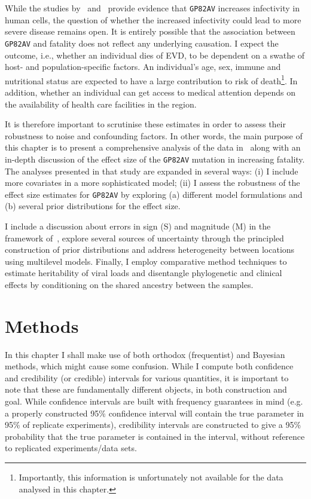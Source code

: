 While the studies by~\cite{Urbanowicz2016} and~\cite{Diehl2016} provide evidence that \verb|GP82AV| increases infectivity in human cells, the question of whether the increased infectivity could lead to more severe disease remains open.
It is entirely possible that the association between \verb|GP82AV| and fatality does not reflect any underlying causation.
I expect the outcome, i.e., whether an individual dies of EVD, to be dependent on a swathe of host- and population-specific factors.
An individual's age, sex, immune and nutritional status are expected to have a large contribution to risk of death\footnote{Importantly, this information is unfortunately not available for the data analysed in this chapter.}.
In addition, whether an individual can get access to medical attention depends on the availability of health care facilities in the region.

It is therefore important to scrutinise these estimates in order to assess their robustness to noise and confounding factors.
In other words, the main purpose of this chapter is to present a comprehensive analysis of the data in~\cite{Diehl2016} along with an in-depth discussion of the effect size of  the \verb|GP82AV| mutation in increasing fatality.
The analyses presented in that study are expanded in several ways: (i) I include more covariates in a more sophisticated model; (ii) I assess the robustness of the effect size estimates for \verb|GP82AV| by exploring (a) different model formulations and (b) several prior distributions for the effect size.

I include a discussion about errors in sign (S) and magnitude (M) in the framework of~\cite{Gelman2014}, explore several sources of uncertainty through the principled construction of prior distributions and address heterogeneity between locations using multilevel models.
Finally, I employ comparative method techniques to estimate heritability of viral loads and disentangle phylogenetic and clinical effects by conditioning on the shared ancestry between the samples.

\section{Methods}

In this chapter I shall make use of both orthodox (frequentist) and Bayesian methods, which might cause some confusion.
While I compute both confidence and credibility (or credible) intervals for various quantities, it is important to note that these are fundamentally different objects, in both construction and goal.
While confidence intervals are built with frequency guarantees in mind (e.g. a properly constructed 95\% confidence interval will contain the true parameter in 95\% of replicate experiments), credibility intervals are constructed to give a 95\% probability that the true parameter is contained in the interval, without reference to replicated experiments/data sets.


